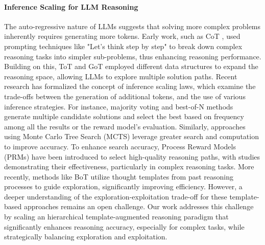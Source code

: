 \paragraph{Inference Scaling for LLM Reasoning}





The auto-regressive nature of LLMs suggests that solving more complex problems inherently requires generating more tokens. Early work, such as CoT \citep{CoT}, used prompting techniques like "Let's think step by step" to break down complex reasoning tasks into simpler sub-problems, thus enhancing reasoning performance. Building on this, ToT \citep{ToT} and GoT \citep{GoT} employed different data structures to expand the reasoning space, allowing LLMs to explore multiple solution paths. Recent research \citep{inferenceScaling,snell2024scaling} has formalized the concept of inference scaling laws, which examine the trade-offs between the generation of additional tokens, and the use of various inference strategies. For instance, majority voting and best-of-N methods \citep{wang2022self,li2023making} generate multiple candidate solutions and select the best based on frequency among all the results or the reward model's evaluation.  Similarly, approaches using Monte Carlo Tree Search (MCTS) \citep{zhang2023planning,liu2024don,choi2023kcts,zhou2023language} leverage greater search and computation to improve accuracy. To enhance search accuracy, Process Reward Models (PRMs) have been introduced to select high-quality reasoning paths, with studies \citep{setlur2024rewarding,snell2024scaling,lightman2023let,luo2024improve,wang2024math} demonstrating their effectiveness, particularly in complex reasoning tasks. 
More recently, methods like BoT \citep{BoT} utilize thought templates from past reasoning processes to guide exploration, significantly improving efficiency. However, a deeper understanding of the exploration-exploitation trade-off \citep{tang2024code,setlur2024rewarding} for these template-based approaches remains an open challenge. Our work addresses this challenge by scaling an hierarchical template-augmented reasoning paradigm that significantly enhances reasoning accuracy, especially for complex tasks, while strategically balancing exploration and exploitation.

